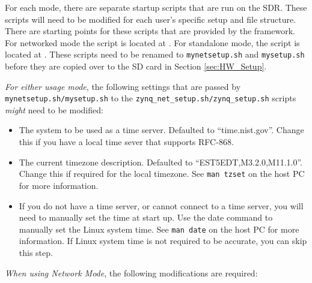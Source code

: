 \begin{flushleft}
For each mode, there are separate startup scripts that are run on the SDR. These scripts will need to be modified for each user's specific setup and file structure.  There are starting points for these scripts that are provided by the framework.  For networked mode the script is located at .  For standalone mode, the script is located at .  These scripts need to be renamed to \texttt{mynetsetup.sh} and \texttt{mysetup.sh} before they are copied over to the SD card in Section \ref{sec:HW_Setup}. \\ \bigskip

\textit{For either usage mode}, the following settings that are passed by \texttt{mynetsetup.sh/mysetup.sh} to the \texttt{zynq\_net\_setup.sh/zynq\_setup.sh} scripts \textit{might} need to be modified:
\end{flushleft}

\begin{itemize}
 \item The system to be used as a time server. Defaulted to ``time.nist.gov''. Change this if you have a local time sever that supports RFC-868.
 \item The current timezone description. Defaulted to ``EST5EDT,M3.2.0,M11.1.0''.  Change this if required for the local timezone. See \texttt{man tzset} on the host PC for more information.
 \item If you do not have a time server, or cannot connect to a time server, you will need to manually set the time at start up.  Use the date command to manually set the Linux system time. See \texttt{man date} on the host PC for more information.  If Linux system time is not required to be accurate, you can skip this step.
\end{itemize}

\begin{flushleft}
\textit{When using Network Mode}, the following modifications are required:
\end{flushleft}

